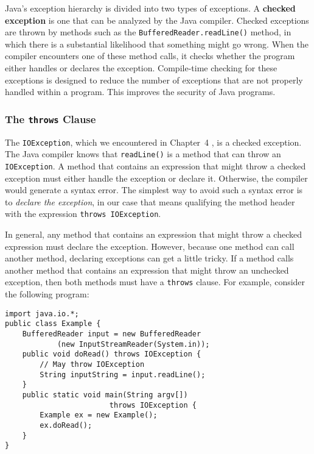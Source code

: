 \noindent Java's exception hierarchy is divided into two types of exceptions.  A
{\bf checked exception} is one that can be analyzed by the Java
 compiler. Checked exceptions are
thrown by methods such as the {\tt Buffered\-Reader.read\-Line()}
method, in which there is a substantial likelihood that something
might go wrong.  When the compiler encounters one of these method
calls, it checks whether the program either handles or declares the
exception.  Compile-time checking for these exceptions is
\mbox{designed} to reduce the number of exceptions that are not
properly handled within a program. This improves the security of Java
programs.


\subsubsection*{The {\tt throws} Clause}
\noindent The {\tt IOException}, which we encountered in
Chapter~4 , is a checked exception.  The Java compiler knows that 
{\tt readLine()} is a method that can throw an {\tt IOException}. 
A method that contains an expression that might throw a
checked exception must either handle the exception or declare it.
Otherwise, the compiler would generate a syntax error.
The simplest way to avoid such a syntax error is to {\em declare the exception},
in our case that means qualifying the method header with the expression
{\tt throws IOException}.

In general, any method that contains an expression that might throw a 
checked expression must declare the exception.   
However, because one method can call another method, declaring exceptions can get a
little tricky. If a method calls another method that contains an
expression that might throw an unchecked exception, then both methods
must have a {\tt throws} clause. For example, consider the following
program:

\begin{jjjlisting}
\begin{lstlisting}
import java.io.*;
public class Example {
    BufferedReader input = new BufferedReader
            (new InputStreamReader(System.in));
    public void doRead() throws IOException {
        // May throw IOException
        String inputString = input.readLine();    
    }
    public static void main(String argv[]) 
                        throws IOException {
        Example ex = new Example();
        ex.doRead();
    }
}
\end{lstlisting}
\end{jjjlisting}

